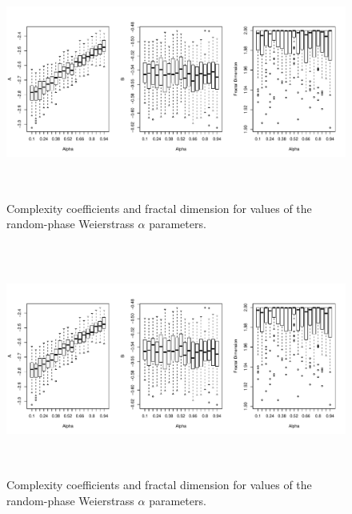 \begin{figure}[!htbp]
  \begin{center}
  \includegraphics[height = 3in, width =6in, keepaspectratio]{./figs/holder_coeffs-boxplots.pdf}
   
  \caption{Complexity coefficients and fractal dimension 
   for values of the random-phase
    Weierstrass $\alpha$ parameters.  }
    \label{fig:rp-weierstrass-boxplot}
  \end{center}
\end{figure}
\begin{figure}[!htbp]
  \begin{center}
  \includegraphics[height = 3in, width =6in, keepaspectratio]{./figs/holder_coeffs-boxplots.pdf}
   
  \caption{Complexity coefficients and fractal dimension 
   for values of the random-phase
    Weierstrass $\alpha$ parameters.  }
    \label{fig:rp-weierstrass-boxplot}
  \end{center}
\end{figure}


